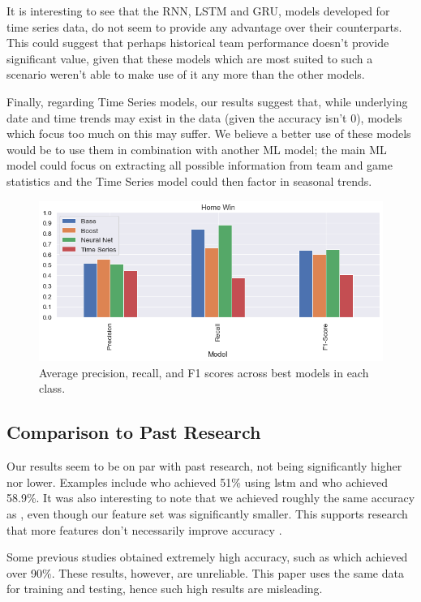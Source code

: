 \documentclass{article}
\begin{document}
It is interesting to see that the RNN, LSTM and GRU, models developed for time series data, do not seem to provide any advantage over their counterparts. This could suggest that perhaps historical team performance doesn't provide significant value, given that these models which are most suited to such a scenario weren't able to make use of it any more than the other models. 

Finally, regarding Time Series models, our results suggest that, while underlying date and time trends may exist in the data (given the accuracy isn’t 0), models which focus too much on this may suffer. We believe a better use of these models would be to use them in combination with another ML model; the main ML model could focus on extracting all possible information from team and game statistics and the Time Series model could then factor in seasonal trends.

\begin{figure}[!htb]
    \centering
    \includegraphics[width=0.7\linewidth]{Images/Figure 7.png}
    \caption{Average precision, recall, and F1 scores across best models in each class.}
    \label{fig:modelcomparisons}
\end{figure}

 

\subsection{Comparison to Past Research}
\label{pastresearch}

Our results seem to be on par with past research, not being significantly higher nor lower. Examples include \cite{goddijn2018surebet} who achieved 51\% using \gls{lstm} and \cite{mccabe2008artificial} who achieved 58.9\%. It was also interesting to note that we achieved roughly the same accuracy as \cite{dubitzky2019open}, even though our feature set was significantly smaller. This supports research that more features don’t necessarily improve accuracy \cite{horvat2020use}.  

Some previous studies obtained extremely high accuracy, such as \cite{owramipur2013football} which achieved over 90\%. These results, however, are unreliable. This paper uses the same data for training and testing, hence such high results are misleading.
\end{document}
